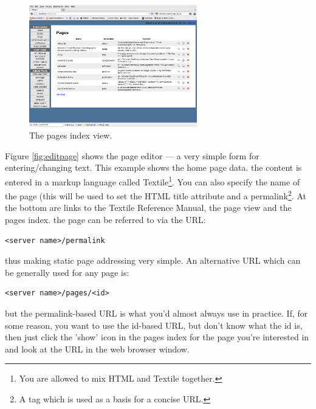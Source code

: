 \documentclass[12pt,twoside]{article}
\begin{document}
\begin{figure}[!htb]
\begin{center}
\includegraphics[width=0.65\textwidth]{pageidx}
\caption{The pages index view.\label{fig:pageidx}}
\end{center}
\end{figure}

Figure \ref{fig:editpage} shows the page editor --- a very simple form
for entering/changing text. This example shows the home page data. 
the content is entered in a markup language called Textile\footnote{You are 
allowed to mix HTML and Textile together.}. You can also specify the name
of the page (this will be used to set the HTML title attribute and a
permalink\footnote{A tag which is used as a basis for a concise URL.}.
At the bottom are links to the Textile Reference Manual, the page view
and the pages index. the page can be referred to via the URL:
\begin{verbatim}
<server name>/permalink
\end{verbatim}
thus making static page addressing very simple.
An alternative URL which can be generally used for any page is:
\begin{verbatim}
<server name>/pages/<id>
\end{verbatim}
but the permalink-based URL is what you'd almost always use in practice.
If, for some reason, you want to use the id-based URL, but don't know
what the id is, then just click the 'show' icon in the pages index for
the page you're interested in and look at the URL in the web browser window.
\end{document}
